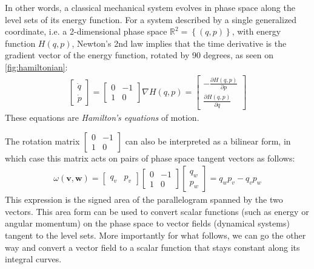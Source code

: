 \documentclass[12pt,final,3p]{elsarticle}
\begin{document}
In other words, a classical mechanical system evolves in phase space along the level sets of its energy function. For a system described by a single generalized coordinate, i.e. a 2-dimensional phase space $\mathbb{R}^{2} = \left\lbrace(q,p) \right\rbrace$, with energy function $H(q,p)$, Newton's 2nd law implies that the time derivative is the gradient vector of the energy function, rotated by 90 degrees, as seen on \autoref{fig:hamiltonian}:
\begin{align}
\begin{bmatrix}
\dot{q} \\
\dot{p}
\end{bmatrix}
=
\begin{bmatrix}
0 & -1 \\
1 & 0
\end{bmatrix} \nabla H(q,p) = 
\begin{bmatrix}
-\frac{\partial H(q,p)}{\partial p} \\
\frac{\partial H(q,p)}{\partial q}
\end{bmatrix} 
\end{align}
These equations are \emph{Hamilton's equations} of motion.

The rotation matrix $\begin{bmatrix}
0 & -1 \\
1 & 0
\end{bmatrix}$ can also be interpreted as a bilinear form, in which case this matrix acts on pairs of phase space tangent vectors as follows:
\begin{align}
\omega(\mathbf{v},\mathbf{w}) = \begin{bmatrix}
q_{v} & p_{v}
\end{bmatrix}\begin{bmatrix}
0 & -1 \\
1 & 0
\end{bmatrix}\begin{bmatrix}
q_{w} \\
p_{w}
\end{bmatrix} = q_{w}p_{v} - q_{v}p_{w}
\end{align}
This expression is the signed area of the parallelogram spanned by the two vectors. This area form can be used to convert scalar functions (such as energy or angular momentum) on the phase space to vector fields (dynamical systems) tangent to the level sets. More importantly for what follows, we can go the other way and convert a vector field to a scalar function that stays constant along its integral curves.
\end{document}

